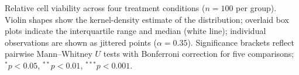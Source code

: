 \caption{Relative cell viability across four treatment conditions ($n=100$ per group).
Violin shapes show the kernel-density estimate of the distribution; overlaid box plots indicate the interquartile range and median (white line); individual observations are shown as jittered points ($\alpha=0.35$).
Significance brackets reflect pairwise Mann--Whitney $U$ tests with Bonferroni correction for five comparisons; $^{*}p<0.05$, $^{**}p<0.01$, $^{***}p<0.001$.}
